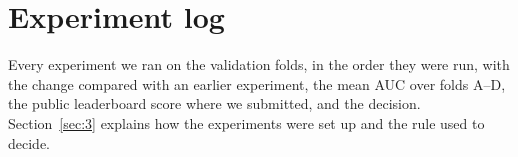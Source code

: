 \section{Experiment log}\label{sec:B}

Every experiment we ran on the validation folds, in the order they were run, with the change compared with an earlier experiment, the mean AUC over folds A--D, the public leaderboard score where we submitted, and the decision. Section~\ref{sec:3} explains how the experiments were set up and the rule used to decide.

{\small
  \def\tablecaption{Every experiment, its change and the decision (from experiments/journal.md)}
  
}
